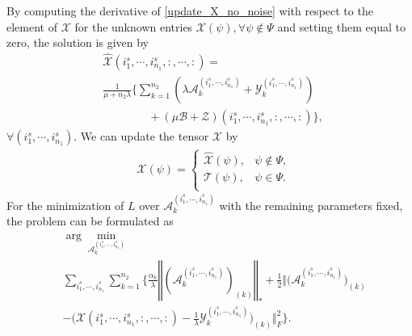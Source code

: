 \documentclass[12pt, draftcls, onecolumn]{IEEEtran}
\theoremstyle{plain}
\theoremstyle{definition}
\theoremstyle{remark}
\begin{document}
By computing the derivative of \eqref{update_X_no_noise} with respect to the element of $\mathcal{X}$ for the unknown entries $\mathcal{X}(\psi), \forall \psi\notin \Psi$  and setting them equal to zero, the solution is given by
\begin{equation}
\begin{aligned}
    &\hat{\mathcal{X}}(i^s_{1},\cdots,i^s_{n_1},:,\cdots,:) =\\ 
    &\frac{1}{{\mu + n_2\lambda}}\bigg\{ \sum_{k=1}^{n_2}\left(\lambda\mathcal{A}^{(i^s_{1},\cdots,i^s_{n_1})}_k + \mathcal{Y}^{(i^s_{1},\cdots,i^s_{n_1})}_k\right)\\
    &\hspace{4em}+(\mu\mathcal{B} + \mathcal{Z})(i^s_{1},\cdots,i^s_{n_1},:,\cdots,:)\bigg\},\
\end{aligned}
\end{equation}
$\forall (i^s_{1},\cdots,i^s_{n_1})$. We can update the tensor $\mathcal{X}$ by
\begin{equation}
\label{update_X_noisefree}
\begin{aligned}
        &\mathcal{X}(\psi)=
        \left\{
            \begin{array}{ll}
             \hat{\mathcal{X}}(\psi), & \psi\notin\Psi,\\
             \mathcal{T}(\psi), & \psi\in\Psi.\\
             \end{array}
        \right.
\end{aligned}  
\end{equation}
For the minimization of $L$ over $\mathcal{A}^{(i^s_{1},\cdots,i^s_{n_1})}_k$ with the remaining parameters fixed, the problem can be formulated as
\begin{equation}
\begin{aligned}
\nonumber
    &\arg\min_{\mathcal{A}^{(i^s_{1},\cdots,i^s_{n_1})}_k}\  \\ &\sum_{i^s_{1},\cdots,i^s_{n_1}}\sum_{k=1}^{n_2}
    \Bigg\{\frac{\alpha_k}{\lambda}\left\Vert \left(\mathcal{A}^{(i^s_{1},\cdots,i^s_{n_1})}_k\right)_{(k)}\right\Vert_*
    +\frac{1}{2}\Big\Vert\Big(\mathcal{A}^{(i^s_{1},\cdots,i^s_{n_1})}_k\Big)_{(k)}\\
    &-\Big(\mathcal{X}(i^s_{1},\cdots,i^s_{n_1},:,\cdots,:)-\frac{1}{\lambda}\mathcal{Y}^{(i^s_{1},\cdots,i^s_{n_1})}_k\Big)_{(k)}\Big\Vert_F^2\Bigg\}.\\
\end{aligned}
\end{equation}
\end{document}
